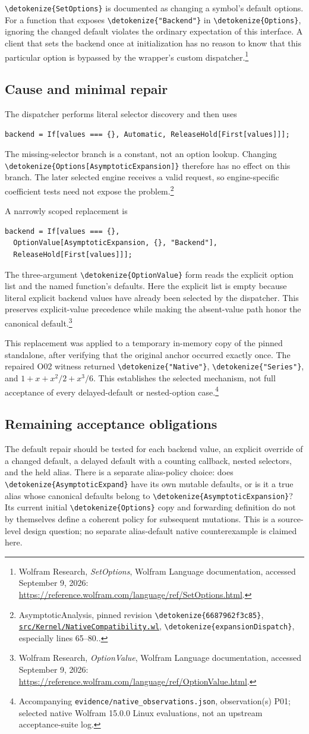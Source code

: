 \documentclass[11pt]{article}
\newcommand{\code}[1]{{\ttfamily\expandafter\nolinkurl\expandafter{\detokenize{#1}}}}
\newcommand{\repo}{https://github.com/VladimirReshetnikov/Asymptotic/blob/6687962f3c858a4f93623cfc496f33e35c6763d4/}
\newcommand{\src}[2]{\footnote{AsymptoticAnalysis, pinned revision \code{6687962f3c85}, \href{\repo#1}{\nolinkurl{#1}}, #2.}}
\newcommand{\wdoc}[1]{\footnote{Wolfram Research, \emph{#1}, Wolfram Language documentation, accessed September 9, 2026: \url{https://reference.wolfram.com/language/ref/#1.html}.}}
\newcommand{\obs}[1]{\footnote{Accompanying \nolinkurl{evidence/native_observations.json}, observation(s) #1; selected native Wolfram 15.0.0 Linux evaluations, not an upstream acceptance-suite log.}}
\begin{document}
\code{SetOptions} is documented as changing a symbol's default options. For a function that exposes \code{"Backend"} in \code{Options}, ignoring the changed default violates the ordinary expectation of this interface. A client that sets the backend once at initialization has no reason to know that this particular option is bypassed by the wrapper's custom dispatcher.\wdoc{SetOptions}

\subsection{Cause and minimal repair}
The dispatcher performs literal selector discovery and then uses
\begin{lstlisting}
backend = If[values === {}, Automatic, ReleaseHold[First[values]]];
\end{lstlisting}
The missing-selector branch is a constant, not an option lookup. Changing \code{Options[AsymptoticExpansion]} therefore has no effect on this branch. The later selected engine receives a valid request, so engine-specific coefficient tests need not expose the problem.\src{src/Kernel/NativeCompatibility.wl}{\code{expansionDispatch}, especially lines 65--80.}

A narrowly scoped replacement is
\begin{lstlisting}
backend = If[values === {},
  OptionValue[AsymptoticExpansion, {}, "Backend"],
  ReleaseHold[First[values]]];
\end{lstlisting}
The three-argument \code{OptionValue} form reads the explicit option list and the named function's defaults. Here the explicit list is empty because literal explicit backend values have already been selected by the dispatcher. This preserves explicit-value precedence while making the absent-value path honor the canonical default.\wdoc{OptionValue}

This replacement was applied to a temporary in-memory copy of the pinned standalone, after verifying that the original anchor occurred exactly once. The repaired O02 witness returned \code{"Native"}, \code{"Series"}, and $1+x+x^2/2+x^3/6$. This establishes the selected mechanism, not full acceptance of every delayed-default or nested-option case.\obs{P01}

\subsection{Remaining acceptance obligations}
The default repair should be tested for each backend value, an explicit override of a changed default, a delayed default with a counting callback, nested selectors, and the held alias. There is a separate alias-policy choice: does \code{AsymptoticExpand} have its own mutable defaults, or is it a true alias whose canonical defaults belong to \code{AsymptoticExpansion}? Its current initial \code{Options} copy and forwarding definition do not by themselves define a coherent policy for subsequent mutations. This is a source-level design question; no separate alias-default native counterexample is claimed here.
\end{document}
